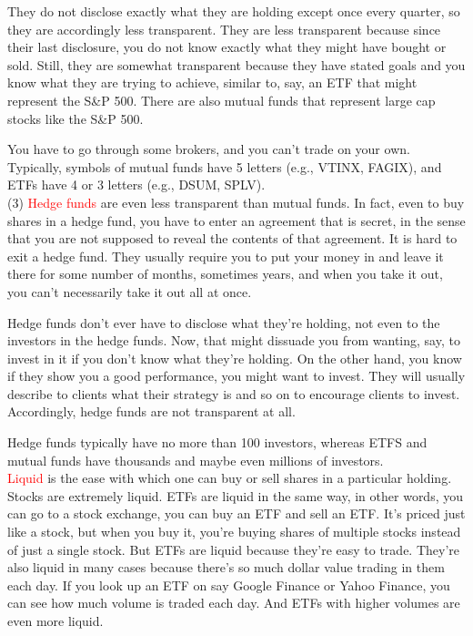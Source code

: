 \documentclass[12pt]{article}
\begin{document}
They do not disclose exactly what they are holding except once every quarter, so they are accordingly less transparent. They are less transparent because since their last disclosure, you do not know exactly what they might have bought or sold. Still, they are somewhat transparent because they have stated goals and you know what they are trying to achieve, similar to, say, an ETF that might represent the S\&P 500. There are also mutual funds that represent large cap stocks like the S\&P 500. 

You have to go through some brokers, and you can't trade on your own. Typically, symbols of mutual funds have 5 letters (e.g., VTINX, FAGIX), and ETFs have 4 or 3 letters (e.g., DSUM, SPLV). \\[5pt]
\noindent
(3) \textcolor{red}{Hedge funds} are even less transparent than mutual funds. In fact, even to buy shares in a hedge fund, you have to enter an agreement that is secret, in the sense that you are not supposed to reveal the contents of that agreement. It is hard to exit a hedge fund. They usually require you to put your money in and leave it there for some number of months, sometimes years, and when you take it out, you can't necessarily take it out all at once. 

Hedge funds don't ever have to disclose what they're holding, not even to the investors in the hedge funds. Now, that might dissuade you from wanting, say, to invest in it if you don't know what they're holding. On the other hand, you know if they show you a good performance, you might want to invest. They will usually describe to clients what their strategy is and so on to encourage clients to invest. Accordingly, hedge funds are not transparent at all. 

Hedge funds typically have no more than 100 investors, whereas ETFS and mutual funds have thousands and maybe even millions of investors. \\[5pt]
\noindent
\textcolor{red}{Liquid} is the ease with which one can buy or sell shares in a particular holding. Stocks are extremely liquid. ETFs are liquid in the same way, in other words, you can go to a stock exchange, you can buy an ETF and sell an ETF. It's priced just like a stock, but when you buy it, you're buying shares of multiple stocks instead of just a single stock. But ETFs are liquid because they're easy to trade. They're also liquid in many cases because there's so much dollar value trading in them each day. If you look up an ETF on say Google Finance or Yahoo Finance, you can see how much volume is traded each day. And ETFs with higher volumes are even more liquid. 
\end{document}
